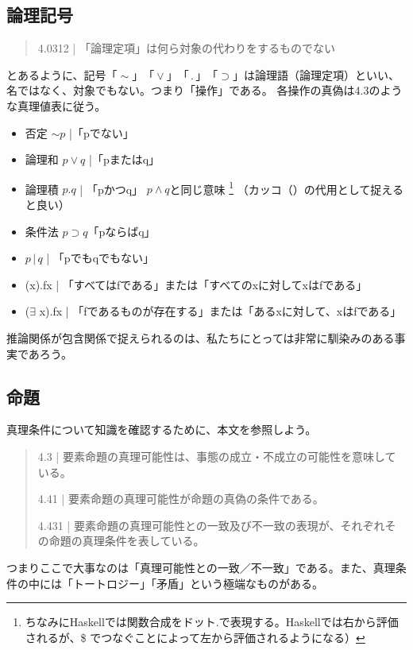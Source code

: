 \documentclass[a4paper,onecolumn,article]{jarticle}
\newcounter{ct}               %
\begin{document}
\subsection{論理記号}
\begin{quote}
  4.0312 | 「論理定項」は何ら対象の代わりをするものでない
\end{quote}
 とあるように、記号$「\sim」「\vee」 「\, . \,」 「\supset」$は論理語（論理定項）といい、名ではなく、対象でもない。つまり「操作」である。
各操作の真偽は4.3のような真理値表に従う。

\begin{itemize}
  \item 否定 $\sim p$ |「pでない」
  \item 論理和 $p\vee q$ |「pまたはq」
  \item 論理積 $p.q$ | 「pかつq」 $p \wedge q$と同じ意味 \footnote{ちなみにHaskellでは関数合成をドット$.$で表現する。Haskellでは右から評価されるが、\$ でつなぐことによって左から評価されるようになる）} （カッコ（）の代用として捉えると良い）
  \item 条件法 $p \supset q$「pならばq」
  \item $p \, | \, q$ | 「pでもqでもない」
  \item (x).fx |  「すべてはfである」または「すべてのxに対してxはfである」
  \item ($\exists$ x).fx | 「fであるものが存在する」または「あるxに対して、xはfである」
\end{itemize}

推論関係が包含関係で捉えられるのは、私たちにとっては非常に馴染みのある事実であろう。


\subsection{命題}

真理条件について知識を確認するために、本文を参照しよう。

\begin{quote}
  4.3 | 要素命題の真理可能性は、事態の成立・不成立の可能性を意味している。

  4.41 | 要素命題の真理可能性が命題の真偽の条件である。

  4.431 | 要素命題の真理可能性との一致及び不一致の表現が、それぞれその命題の真理条件を表している。
\end{quote}

つまりここで大事なのは「真理可能性との一致／不一致」である。また、真理条件の中には「トートロジー」「矛盾」という極端なものがある。
\end{document}
